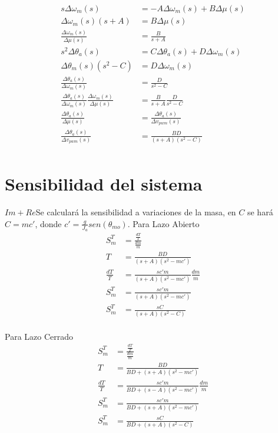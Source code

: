 \documentclass[a4paper]{IEEEtran} %
\begin{document}
\begin{equation}
    \begin{split}
        s\Delta\omega_{m}(s)&=-A\Delta\omega_{m}(s)+B\Delta\mu(s)\\
        \Delta\omega_{m}(s)(s+A)&=B\Delta\mu(s)\\
        \frac{\Delta\omega_{m}(s)}{\Delta\mu(s)}&=\frac{B}{s+A}\\
        s^2\Delta\theta_{a}(s)&=C\Delta\theta_{a}(s)+D\Delta\omega_{m}(s)\\
        \Delta\theta_{m}(s)(s^2-C)&=D\Delta\omega_{m}(s)\\
        \frac{\Delta\theta_{a}(s)}{\Delta\omega_{m}(s)}&=\frac{D}{s^2-C}\\
        \frac{\Delta\theta_{a}(s)}{\Delta\omega_{m}(s)}\frac{\Delta\omega_{m}(s)}{\Delta\mu(s)}&=\frac{B}{s+A}\frac{D}{s^2-C}\\
        \frac{\Delta\theta_{a}(s)}{\Delta\mu(s)}&=\frac{\Delta\theta_{a}(s)}{\Delta v_{pwm}(s)}\\
        \frac{\Delta\theta_{a}(s)}{\Delta v_{pwm}(s)}&=\frac{BD}{(s+A)(s^2-C)}\\
    \end{split}
    \label{eq:linealfin1}
\end{equation}
\section{Sensibilidad del sistema}
$Im+Re$Se calculará la sensibilidad a variaciones de la masa, en $C$ se hará $C=mc'$, donde $c'=\frac{g}{J_{a}}sen(\theta_{mo})$.
Para Lazo Abierto
\begin{equation}
    \begin{split}
        S_m^T&=\frac{\frac{dT}{T}}{\frac{dm}{m}}\\
        T&=\frac{BD}{(s+A)(s^2-mc')}\\
        \frac{dT}{T}&=\frac{sc'm}{(s+A)(s^2-mc')}\frac{dm}{m}\\
        S_m^T&=\frac{sc'm}{(s+A)(s^2-mc')}\\
        S_m^T&=\frac{sC}{(s+A)(s^2-C)}\\
    \end{split}
    \label{eq:m_sensi}
\end{equation}

Para Lazo Cerrado
\begin{equation}
    \begin{split}
        S_m^T&=\frac{\frac{dT}{T}}{\frac{dm}{m}}\\
        T&=\frac{BD}{BD+(s+A)(s^2-mc')}\\
        \frac{dT}{T}&=\frac{sc'm}{BD+(s-A)(s^2-mc')}\frac{dm}{m}\\
        S_m^T&=\frac{sc'm}{BD+(s+A)(s^2-mc')}\\
        S_m^T&=\frac{sC}{BD+(s+A)(s^2-C)}\\
    \end{split}
    \label{eq:m_sensiclose}
\end{equation}
\end{document}
